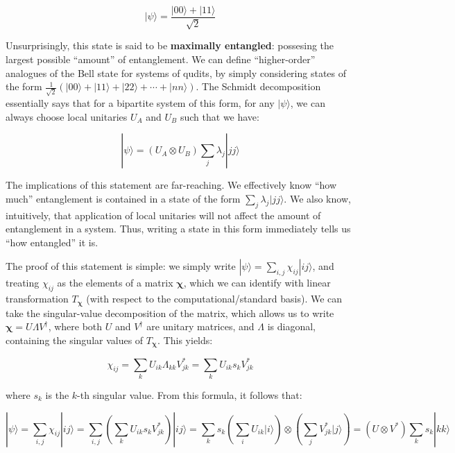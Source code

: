 \documentclass[
 10pt,
 amsmath,amssymb,
 notitlepage,
]{revtex4-1}
\begin{document}
\begin{equation}
  |\psi\rangle = \frac{|00\rangle + |11\rangle}{\sqrt{2}}
  \end{equation}

Unsurprisingly, this state is said to be \textbf{maximally entangled}: possesing the largest possible ``amount'' of entanglement. We can define ``higher-order'' analogues of the Bell state for systems of qudits,
by simply considering states of the form $\frac{1}{\sqrt{2}} (|00\rangle + |11\rangle + |22\rangle + \cdots + |nn\rangle)$. The Schmidt decomposition essentially says that for a bipartite system of this form, for any $|\psi\rangle$,
we can always choose local unitaries $U_A$ and $U_B$ such that we have:

\begin{equation}
|\psi\rangle = (U_A \otimes U_B) \displaystyle\sum_{j} \lambda_j |jj\rangle
\end{equation}

The implications of this statement are far-reaching. We effectively know ``how much'' entanglement is contained in a state of the form $\sum_{j} \lambda_j |jj\rangle$. We also know, intuitively, that application of local unitaries
will not affect the amount of entanglement in a system. Thus, writing a state in this form immediately tells us ``how entangled'' it is.
\newline

The proof of this statement is simple: we simply write $|\psi\rangle = \sum_{i, j} \chi_{ij} |ij\rangle$, and treating $\chi_{ij}$ as the elements of a matrix $\bm{\chi}$, which we can identify with linear transformation $T_{\bm{\chi}}$
(with respect to the computational/standard basis). We can take the singular-value decomposition of the matrix, which allows us to write $\bm{\chi} = U \Lambda V^{\dagger}$, where both $U$ and $V^{\dagger}$
are unitary matrices, and $\Lambda$ is diagonal, containing the singular values of $T_{\bm{\chi}}$. This yields:

$$\chi_{ij} = \displaystyle\sum_{k} U_{ik} \Lambda_{kk} V_{jk}^{*} = \displaystyle\sum_{k} U_{ik} s_{k} V_{jk}^{*}$$

where $s_k$ is the $k$-th singular value. From this formula, it follows that:

$$|\psi\rangle = \displaystyle\sum_{i, j} \chi_{ij} |ij\rangle = \displaystyle\sum_{i, j} \left( \displaystyle\sum_{k} U_{ik} s_{k} V_{jk}^{*} \right) |ij\rangle = \displaystyle\sum_{k} s_k \left( \displaystyle\sum_{i} U_{ik} |i\rangle \right) \otimes \left( \displaystyle\sum_{j} V_{jk}^{*} |j\rangle \right) = (U \otimes V^{*}) \displaystyle\sum_{k} s_k |kk\rangle$$
\end{document}
